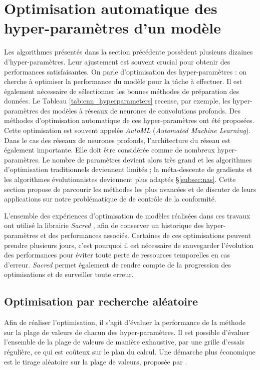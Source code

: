 \section{Optimisation automatique des hyper-paramètres d'un modèle} \label{sec:auto_ml}
Les algorithmes présentés dans la section précédente possèdent plusieurs dizaines d'hyper-paramètres.
Leur ajustement est souvent crucial pour obtenir des performances satisfaisantes.
On parle d'optimisation des hyper-paramètres : on cherche à optimiser la performance du modèle pour la tâche à effectuer.
Il est également nécessaire de sélectionner les bonnes méthodes de préparation des données.
Le Tableau \ref{tab:cnn_hyperparameters} recense, par exemple, les hyper-paramètres des modèles à réseaux de neurones de convolutions profonds.
Des méthodes d'optimisation automatique de ces hyper-paramètres ont été proposées.
Cette optimisation est souvent appelée \textit{AutoML} (\textit{Automated Machine Learning}).
Dans le cas des réseaux de neurones profonds, l'architecture du réseau est également importante.
Elle doit être considérée comme de nombreux hyper-paramètres.
Le nombre de paramètres devient alors très grand et les algorithmes d'optimisation traditionnels deviennent limités ; la méta-descente de gradients et les algorithmes évolutionnistes deviennent plus adaptés §\ref{subsec:nas}.
Cette section propose de parcourir les méthodes les plus avancées et de discuter de leurs applications sur notre problématique de de contrôle de la conformité.

L'ensemble des expériences d'optimisation de modèles réalisées dans ces travaux ont utilisé la librairie \textit{Sacred} \cite{greff_sacred_2017}, afin de conserver un historique des hyper-paramètres et des performances associés.
Certaines de ces optimisations peuvent prendre plusieurs jours, c'est pourquoi il est nécessaire de sauvegarder l'évolution des performances pour éviter toute perte de ressources temporelles en cas d'erreur.
\textit{Sacred} permet également de rendre compte de la progression des optimisations et de surveiller toute erreur.

\subsection{Optimisation par recherche aléatoire} \label{subsec:random_search}
Afin de réaliser l'optimisation, il s'agit d'évaluer la performance de la méthode sur la plage de valeurs de chacun des hyper-paramètres.
Il est possible d'évaluer l'ensemble de la plage de valeurs de manière exhaustive, par une grille d'essais régulière, ce qui est coûteux sur le plan du calcul.
Une démarche plus économique est le tirage aléatoire sur la plage de valeurs, proposée par \citeauthor{bergstra_random_2012} \cite{bergstra_random_2012}.

